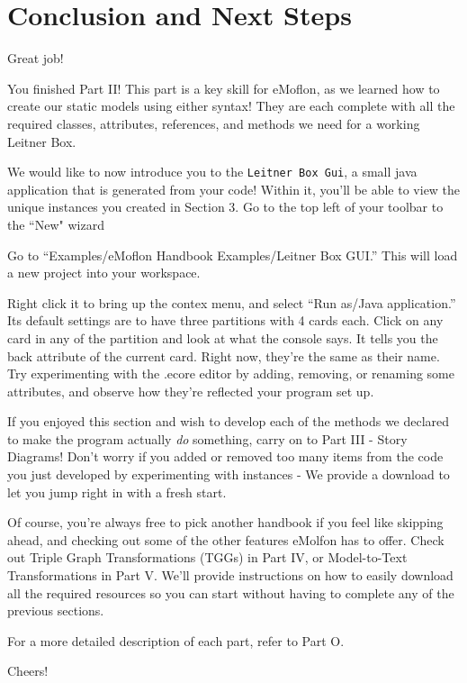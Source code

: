\genHeader
\section{Conclusion and Next Steps}

\hypertarget{conclusion}{Great job!} You finished Part II! This part is a key skill for eMoflon, as we learned how to create our static models using either syntax! They are each complete with all the required classes, attributes, references, and methods we need for a working Leitner Box.

We would like to now introduce you to the \texttt{Leitner Box Gui}, a small java application that is generated from your code! Within it, you'll be able to view the unique instances you created in Section 3. Go to the top left of your toolbar to the ``New" wizard %

Go to ``Examples/eMoflon Handbook Examples/Leitner Box GUI.'' This will load a new project into your workspace. 

Right click it to bring up the contex menu, and select ``Run as/Java application.'' Its default settings are to have three partitions with 4 cards each. Click on any card in any of the partition and look at what the console says. It tells you the back attribute of the current card. Right now, they're the same as their  name. Try experimenting with the .ecore editor by adding, removing, or renaming some attributes, and observe how they're reflected your program set up.

If you enjoyed this section and wish to develop each of the methods we declared to make the program actually \emph{do} something, carry on to Part III - Story Diagrams! Don't worry if you added or removed too many items from the code you just developed by experimenting with instances - We provide a download to let you jump right in with a fresh start. 

Of course, you're always free to pick another handbook if you feel like skipping ahead, and checking out some of the other features eMolfon has to offer. Check out Triple Graph Transformations (TGGs)  in Part IV, or Model-to-Text Transformations in Part V. We'll provide instructions on how to easily download all the required resources so you can start without having to complete any of the previous sections. 

For a more detailed description of each part, refer to Part O.

Cheers!